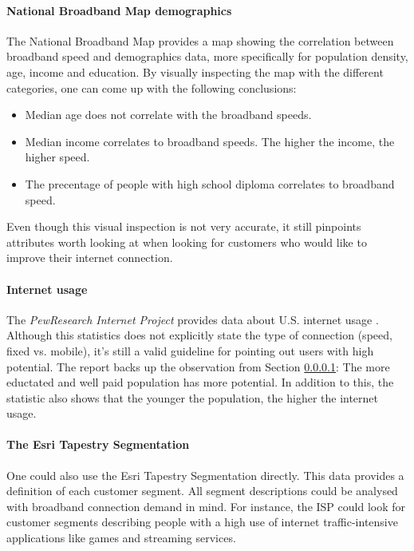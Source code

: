 \documentclass[twocolumn]{article}
\begin{document}
\paragraph{National Broadband Map demographics}
\label{sub:Analyzing data from the Broadband Network Map}
The National Broadband Map provides a map showing the correlation between broadband speed and demographics data, more specifically for population density, age, income and education. By visually inspecting the map with the different categories, one can come up with the following conclusions:
\begin{itemize}
  \item Median age does not correlate with the broadband speeds. 
  \item Median income correlates to broadband speeds. The higher the income, the higher speed.
  \item The precentage of people with high school diploma correlates to broadband speed.
\end{itemize}
Even though this visual inspection is not very accurate, it still pinpoints attributes worth looking at when looking for customers who would like to improve their internet connection.

\paragraph{Internet usage}
\label{sub:Internet usage}
The \textit{PewResearch Internet Project} provides data about U.S. internet usage \cite{noauthor_2013-ev}. Although this statistics does not explicitly state the type of connection (speed, fixed vs. mobile), it's still a valid guideline for pointing out users with high potential. The report backs up the observation from Section \ref{sub:Analyzing data from the Broadband Network Map}: The more eductated and well paid population has more potential. In addition to this, the statistic also shows that the younger the population, the higher the internet usage.

\paragraph{The Esri Tapestry Segmentation}
\label{sub:The Esri Tapestry Segmentation}
One could also use the Esri Tapestry Segmentation directly. This data provides a definition of each customer segment. All segment descriptions could be analysed with broadband connection demand in mind. For instance, the ISP could look for customer segments describing people with a high use of internet traffic-intensive applications like games and streaming services.
\end{document}
